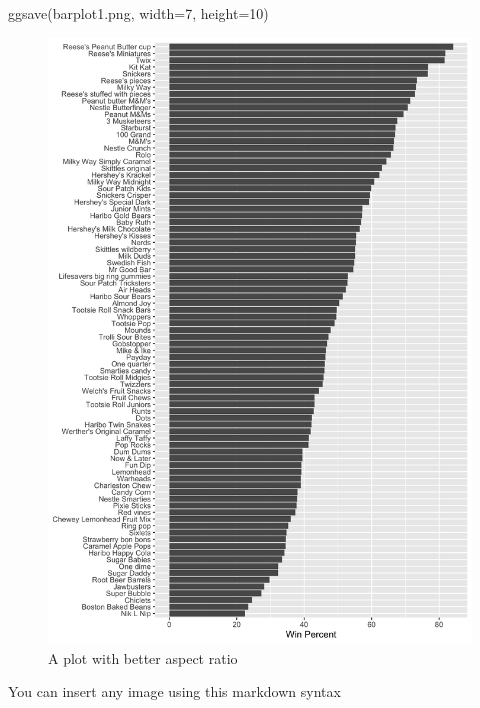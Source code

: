 \documentclass[
  letterpaper,
  DIV=11,
  numbers=noendperiod]{scrartcl}
\newenvironment{Shaded}{\begin{snugshade}}{\end{snugshade}}
\newcommand{\AttributeTok}[1]{\textcolor[rgb]{0.40,0.45,0.13}{#1}}
\newcommand{\DecValTok}[1]{\textcolor[rgb]{0.68,0.00,0.00}{#1}}
\newcommand{\FunctionTok}[1]{\textcolor[rgb]{0.28,0.35,0.67}{#1}}
\newcommand{\NormalTok}[1]{\textcolor[rgb]{0.00,0.23,0.31}{#1}}
\newcommand{\StringTok}[1]{\textcolor[rgb]{0.13,0.47,0.30}{#1}}
\begin{document}
\begin{Shaded}
\begin{Highlighting}[]
  \FunctionTok{ggsave}\NormalTok{(}\StringTok{\textquotesingle{}barplot1.png\textquotesingle{}}\NormalTok{, }\AttributeTok{width=}\DecValTok{7}\NormalTok{, }\AttributeTok{height=}\DecValTok{10}\NormalTok{)}
\end{Highlighting}
\end{Shaded}

\begin{figure}

{\centering \includegraphics{barplot1.png}

}

\caption{A plot with better aspect ratio}

\end{figure}

You can insert any image using this markdown syntax
\end{document}
